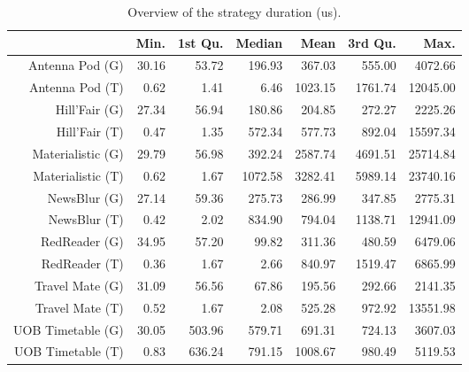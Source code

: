 \begin{table}[ht]
\centering
\begin{tabular}{rrrrrrr}
  \hline
 & Min. & 1st Qu. & Median & Mean & 3rd Qu. & Max. \\ 
  \hline
Antenna Pod (G) & 30.16 & 53.72 & 196.93 & 367.03 & 555.00 & 4072.66 \\ 
  Antenna Pod (T) & 0.62 & 1.41 & 6.46 & 1023.15 & 1761.74 & 12045.00 \\ 
  Hill'Fair (G) & 27.34 & 56.94 & 180.86 & 204.85 & 272.27 & 2225.26 \\ 
  Hill'Fair (T) & 0.47 & 1.35 & 572.34 & 577.73 & 892.04 & 15597.34 \\ 
  Materialistic (G) & 29.79 & 56.98 & 392.24 & 2587.74 & 4691.51 & 25714.84 \\ 
  Materialistic (T) & 0.62 & 1.67 & 1072.58 & 3282.41 & 5989.14 & 23740.16 \\ 
  NewsBlur (G) & 27.14 & 59.36 & 275.73 & 286.99 & 347.85 & 2775.31 \\ 
  NewsBlur (T) & 0.42 & 2.02 & 834.90 & 794.04 & 1138.71 & 12941.09 \\ 
  RedReader (G) & 34.95 & 57.20 & 99.82 & 311.36 & 480.59 & 6479.06 \\ 
  RedReader (T) & 0.36 & 1.67 & 2.66 & 840.97 & 1519.47 & 6865.99 \\ 
  Travel Mate (G) & 31.09 & 56.56 & 67.86 & 195.56 & 292.66 & 2141.35 \\ 
  Travel Mate (T) & 0.52 & 1.67 & 2.08 & 525.28 & 972.92 & 13551.98 \\ 
  UOB Timetable (G) & 30.05 & 503.96 & 579.71 & 691.31 & 724.13 & 3607.03 \\ 
  UOB Timetable (T) & 0.83 & 636.24 & 791.15 & 1008.67 & 980.49 & 5119.53 \\ 
   \hline
\end{tabular}
\caption{Overview of the strategy duration (us).} 
\label{tab:results:rq0:summary:duration_subject}
\end{table}
